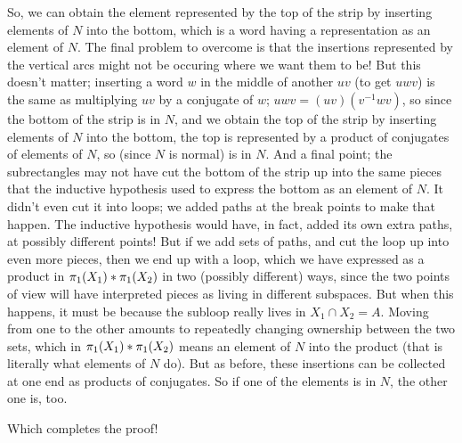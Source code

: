 \msk




\leavevmode


\epsfxsize=3.5in

\bsk

So, we can obtain the element represented by the top of the strip by 
inserting elements of $N$ into the bottom, which 
is a word having a representation as an 
element of $N$. The final problem to overcome is that the
insertions represented by the vertical arcs might not be occuring
where we want them to be! But this doesn't matter; inserting a word $w$
in the middle of another $uv$ (to get $uwv$) 
is the same as multiplying $uv$ by a conjugate of $w$;
$uwv = (uv)(v^{-1}wv)$, so since the bottom of the strip is 
in $N$, and we obtain the top of the strip by inserting elements
of $N$ into the bottom, the top is represented by a product of 
conjugates of elements of $N$, so (since $N$ is normal) is in $N$.
And a  final point; the subrectangles may not have 
cut the bottom of the strip up into the same pieces that the inductive
hypothesis used to express the bottom as an element of $N$. It didn't even 
cut it into loops; we added paths at the break points to make that happen.
The inductive hypothesis would have, in fact, added its own extra paths,
at possibly different points!
But if we add  sets of paths, 
and cut the loop up into even more pieces, 
then we end up with a loop, which we have expressed as a product in
$\pi_1(X_1)*\pi_1(X_2)$ in two (possibly different) ways, since the 
two points of view will have interpreted pieces as living in 
different subspaces. But when this happens, it must be because
the subloop really lives in $X_1\cap X_2=A$. Moving from one
to the other amounts to repeatedly changing ownership between the 
two sets, which in $\pi_1(X_1)*\pi_1(X_2)$ means 
an element of $N$ into the product (that is literally what elements
of $N$ do). But as before, these insertions can be collected at one
end as products of conjugates. So if one of the elements is in $N$, 
the other one is, too.

\msk

Which completes the proof! 

\bsk

